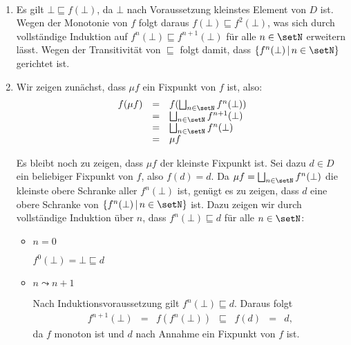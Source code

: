 \begin{beweis} \
  \begin{enumerate}
    \item Es gilt $\bot \sqsubseteq f(\bot)$, da $\bot$ nach Voraussetzung kleinstes Element von $D$ ist.
          Wegen der Monotonie von $f$ folgt daraus $f(\bot) \sqsubseteq f^2(\bot)$, was sich durch
          vollst\"andige Induktion auf $f^n(\bot) \sqsubseteq f^{n+1}(\bot)$ f\"ur alle $n\in\setN$
          erweitern l\"asst. Wegen der Transitivit\"at von $\sqsubseteq$ folgt damit, dass
          $\{f^n(\bot)\,|\,n\in\setN\}$ gerichtet ist.
    
    \item Wir zeigen zun\"achst, dass $\mu f$ ein Fixpunkt von $f$ ist, also:
          \[\begin{array}{rcl}
            f(\mu f) & = & f(\bigsqcup_{n\in\setN} f^n(\bot)) \\
                     & = & \bigsqcup_{n\in\setN} f^{n+1}(\bot) \\
                     & = & \bigsqcup_{n\in\setN} f^n(\bot) \\
                     & = & \mu f
          \end{array}\]

          Es bleibt noch zu zeigen, dass $\mu f$ der kleinste Fixpunkt ist. Sei dazu $d \in D$ ein
          beliebiger Fixpunkt von $f$, also $f(d) = d$. Da $\mu f = \bigsqcup_{n\in\setN} f^n(\bot)$
          die kleinste obere Schranke aller $f^n(\bot)$ ist, gen\"ugt es zu zeigen, dass $d$ eine
          obere Schranke von $\{f^n(\bot)\,|\,n\in\setN\}$ ist. Dazu zeigen wir durch vollst\"andige
          Induktion \"uber $n$, dass $f^n(\bot) \sqsubseteq d$ f\"ur alle $n\in\setN$:
          \begin{itemize}
            \item $n=0$

                  $f^0(\bot) = \bot \sqsubseteq d$

            \item $n\leadsto{n+1}$

                  Nach Induktionsvoraussetzung gilt $f^n(\bot) \sqsubseteq d$. Daraus folgt
                  \[\begin{array}{rclclcl}
                    f^{n+1}(\bot) & = & f(f^n(\bot)) & \sqsubseteq & f(d) & = & d,
                  \end{array}\]
                  da $f$ monoton ist und $d$ nach Annahme ein Fixpunkt von $f$ ist.
          \end{itemize}
  \end{enumerate}
\end{beweis}

